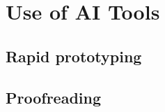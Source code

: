 \chapter{Use of AI Tools}
\label{chapt:UseOfAITools}

\section{Rapid prototyping}
\section{Proofreading}